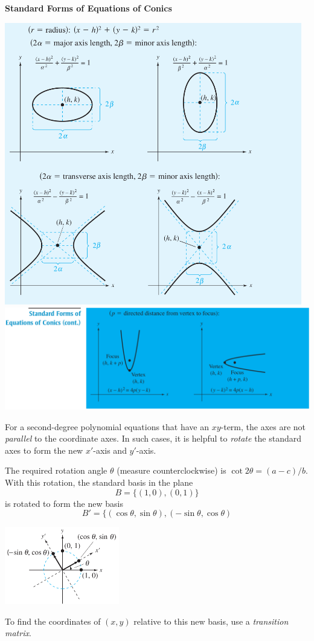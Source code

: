\documentclass{article}
\newcommand\B{\textbf}
\newcommand\T{\textit}
\begin{document}
    \B{Standard Forms of Equations of Conics}
    \begin{center}
        \includegraphics[width = 13cm]{images/coniceq.png} \\
        \includegraphics[width = 16cm]{images/conic1.png}
    \end{center}

    For a second-degree polynomial equations that have an $xy$-term, the axes are not \T{parallel} to the coordinate
    axes. In such cases, it is helpful to \T{rotate} the standard axes to form the new $x'$-axis and $y'$-axis.

    The required rotation angle $\theta$ (measure counterclockwise) is $\cot{2\theta} = (a - c)/b$. With this rotation, 
    the standard basis in the plane
    \[ B = \{ (1,0), (0,1) \} \]
    is rotated to form the new basis
    \[ B' = \{ (\cos{\theta}, \sin{\theta}), (-\sin{\theta}, \cos{\theta})\]
    \begin{center}
        \includegraphics[width = 5cm]{images/rotateaxes.png}
    \end{center}
    To find the coordinates of $(x,y)$ relative to this new basis, use a \T{transition matrix}.
\end{document}
